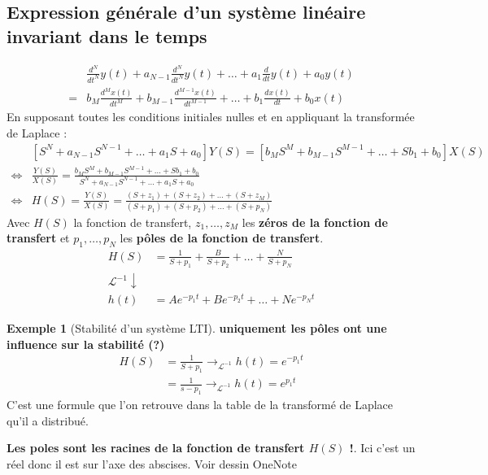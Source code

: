 \documentclass{article}
\theoremstyle{plain}%
\theoremstyle{definition}
\newtheorem{exmp}{Exemple}[section]
\theoremstyle{remark}
\begin{document}
\subsection{Expression générale d'un système linéaire invariant dans le temps}
\begin{align*}
    &\frac{d^N}{dt^N} y(t) + a_{N-1}\frac{d^N}{dt^N} y(t) + \dots + a_1 \frac{d}{dt}y(t) + a_0 y(t) \\
    =& b_M \frac{d^M x(t)}{dt^M} + b_{M-1} \frac{d^{M-1} x(t)}{dt^{M-1}} + \dots + b_1 \frac{d x(t)}{dt} + b_0 x(t)
\end{align*}
En supposant toutes les conditions initiales nulles et en appliquant la transformée de Laplace : 
\begin{align*}
    & [S^N + a_{N-1} S^{N-1} + \dots + a_1 S + a_0]Y(S) = [b_M S^M + b_{M-1} S^{M-1} + \dots + S b_1 + b_0] X(S) \\
    \Leftrightarrow & \frac{Y(S)}{X(S)} = \frac{b_M S^M + b_{M-1} S^{M-1} + \dots + S b_1 + b_0}{S^N + a_{N-1} S^{N-1} + \dots + a_1 S + a_0} \\ 
    \Leftrightarrow & H(S) = \frac{Y(S)}{X(S)} = \frac{(S + z_1) + (S + z_2) + \dots + (S + z_M)}{(S + p_1) + (S + p_2) + \dots + (S + p_N)}
\end{align*}
Avec $ H(S) $ la fonction de transfert, $ z_1, \dots, z_M $  les \textbf{zéros de la fonction de transfert} et $ p_1, \dots, p_N $ les \textbf{pôles de la fonction de transfert}.
\begin{align*}
    H(S) &= \frac{1}{S+p_1} + \frac{B}{S+p_2} + \dots + \frac{N}{S + p_N} \\
    \mathcal{L}^{-1} \downarrow & \\
    h(t) &= Ae^{-p_1t} + Be^{-p_2t} + \dots + Ne^{-p_Nt}
\end{align*}

\begin{exmp}[Stabilité d'un système LTI]
    \textbf{uniquement les pôles ont une influence sur la stabilité (?)}
    \begin{align*}
        H(S) &= \frac{1}{S+p_1} \rightarrow_{\mathcal{L}^{-1}} h(t) = e^{-p_1t} \\
            &= \frac{1}{s-p_1} \to_{\mathcal{L}^{-1}} h(t) = e^{p_1t}
    \end{align*}
    C'est une formule que l'on retrouve dans la table de la transformé de Laplace qu'il a distribué.

    \textbf{Les poles sont les racines de la fonction de transfert $ H(S) $ !}. Ici c'est un réel donc il est sur l'axe des abscises.
    Voir dessin OneNote
\end{exmp}
\end{document}
